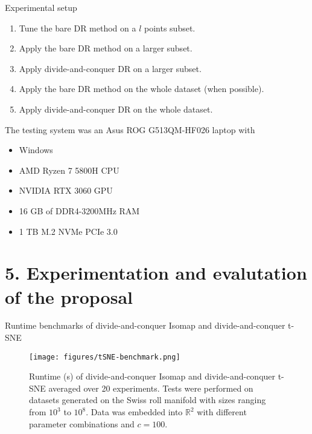\documentclass[10pt]{beamer}
\begin{document}
\begin{frame}{Experimental setup}
    \begin{enumerate}
        \item \alert{Tune} the bare DR method on a $l$ points subset.
        \item Apply the bare DR method on a larger subset.
        \item Apply divide-and-conquer DR on a larger subset.
        \item Apply the bare DR method on the whole dataset (when possible).
        \item Apply divide-and-conquer DR on the whole dataset.
    \end{enumerate}

    The \alert{testing system} was an Asus ROG G513QM-HF026 laptop with
    \begin{itemize}
        \item Windows
        \item AMD Ryzen 7 5800H CPU
        \item NVIDIA RTX 3060 GPU
        \item 16 GB of DDR4-3200MHz RAM
        \item 1 TB M.2 NVMe PCIe 3.0
    \end{itemize}
\end{frame}

\section{5. Experimentation and evalutation of the proposal}

\begin{frame}{Runtime benchmarks of divide-and-conquer Isomap and divide-and-conquer t-SNE}
    \begin{figure}
    \centering
    \texttt{[image: figures/tSNE-benchmark.png]}
    \caption{Runtime (s) of divide-and-conquer Isomap and divide-and-conquer t-SNE averaged over 20 experiments. Tests were performed on datasets generated on the Swiss roll manifold with sizes ranging from $10^3$ to $10^8$. Data was embedded into $\mathbb{R}^2$ with different parameter combinations and $c=100$.}
    \label{fig:t-SNE-benchmark}
\end{figure}
\end{frame}
\end{document}
